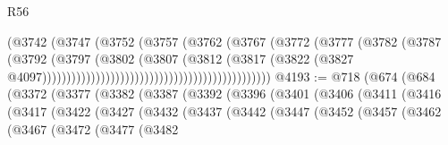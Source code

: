 \begin{lexlean}{R56}
\begin{coremodule}
{{{{{{{{{{{{{{{{{{{{{{{{{{{{{{{{{{{{{{{{{{{{{{{{{{{{{{{{{{{{{{{{{{{{{{{{{{{{{{{{{{{{{{{{{{{{{{{{{{{{{{{{{{{{{{{{{{{{{{{{{{{{{{{{{{{{{{{{{{{{{{{{{{{{{{{{{{{{{{{{{{{{{{{{{{{{{{{{{{{{{{{{{{{{{{{{{{{{{{{{{{{{{{{{{{{                                                              (@3742
                                                                (@3747
                                                                  (@3752
                                                                    (@3757
                                                                      (@3762
                                                                        (@3767
                                                                          (@3772
                                                                            (@3777
                                                                              (@3782
                                                                                (@3787
                                                                                  (@3792
                                                                                    (@3797
                                                                                      (@3802
                                                                                        (@3807
                                                                                          (@3812
                                                                                            (@3817
                                                                                              (@3822
                                                                                                (@3827
                                                                                                  @4097)))))))))))))))))))))))))))))))))))))))))))))))
@4193 := @718
    (@674
      (@684
        (@3372
          (@3377
            (@3382
              (@3387
                (@3392
                  (@3396
                    (@3401
                      (@3406
                        (@3411
                          (@3416
                            (@3417
                              (@3422
                                (@3427
                                  (@3432
                                    (@3437
                                      (@3442
                                        (@3447
                                          (@3452
                                            (@3457
                                              (@3462
                                                (@3467
                                                  (@3472
                                                    (@3477
                                                      (@3482
}}}}}}}}}}}}}}}}}}}}}}}}}}}}}}}}}}}}}}}}}}}}}}}}}}}}}}}}}}}}}}}}}}}}}}}}}}}}}}}}}}}}}}}}}}}}}}}}}}}}}}}}}}}}}}}}}}}}}}}}}}}}}}}}}}}}}}}}}}}}}}}}}}}}}}}}}}}}}}}}}}}}}}}}}}}}}}}}}}}}}}}}}}}}}}}}}}}}}}}}}}}}}}}}}}}
\end{coremodule}
\end{lexlean}
